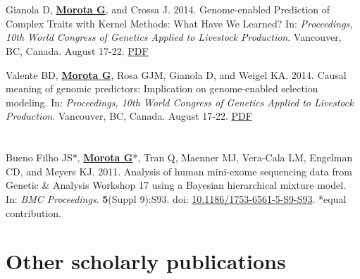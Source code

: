 \documentclass[margin,line,10pt]{res}
\newenvironment{list1}{
  \begin{list}{\ding{113}}{%
      \setlength{\itemsep}{0in}
      \setlength{\parsep}{0in} \setlength{\parskip}{0in}
      \setlength{\topsep}{0in} \setlength{\partopsep}{0in} 
      \setlength{\leftmargin}{0.17in}}}{\end{list}}
\begin{document}
\begin{resume}
\begin{list1}
  
\end{list1}

\section{}
\begin{list1}
\item [\bf{3}.] Gianola D, {\bf \underline{Morota G}}, and Crossa J. 2014. 
Genome-enabled Prediction of Complex Traits with Kernel Methods: What Have We Learned? In: \emph{Proceedings, 10th World Congress of Genetics Applied to Livestock Production}. Vancouver, BC, Canada. August 17-22.  
\textcolor{blue}{\href{http://www.morotalab.org/publications/pdf/gianola2014WCGALP.pdf}{PDF}}  


\vspace{0.5cm}

\item [\bf{2}.] Valente BD, {\bf \underline{Morota G}}, Rosa GJM, Gianola D, and  Weigel KA. 2014. 
Causal meaning of genomic predictors: Implication on genome-enabled selection modeling. In: \emph{Proceedings, 10th World Congress of Genetics Applied to Livestock Production}. Vancouver, BC, Canada. August 17-22. 
\textcolor{blue}{\href{http://www.morotalab.org/publications/pdf/valente2014WCGALP.pdf}{PDF}}
\end{list1}


\section{}
\begin{list1}
\item [\bf{1}.] Bueno Filho JS*, {\bf \underline{Morota G}}*, Tran Q, Maenner MJ, Vera-Cala LM, Engelman CD, and Meyers KJ. 2011. Analysis of human mini-exome sequencing data from Genetic \& Analysis Workshop 17 using a  Bayesian hierarchical mixture model. In: \emph{BMC Proceedings}. {\bf 5}(Suppl 9):S93. doi: \textcolor{blue}{\href{http://dx.doi.org/10.1186/1753-6561-5-S9-S93}{10.1186/1753-6561-5-S9-S93}}. *equal contribution.   
\end{list1}



\vspace{1.0cm}
\section{\sc Other scholarly publications}
\vspace{1.0cm}


\end{resume}
\end{document}
